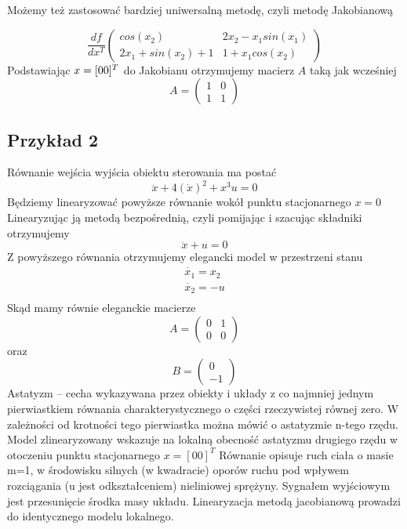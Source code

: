 \documentclass{article}
\begin{document}
			Możemy też zastosować bardziej uniwersalną metodę, czyli metodę Jakobianową

			\begin{equation}
				\frac{df}{dx^T}
				\begin{pmatrix}
					cos(x_2) & 2x_2 - x_1 sin(x_1) \\
					2x_1 + sin(x_2) + 1 & 1 + x_1 cos(x_2)
				\end{pmatrix}
			\end{equation}
			Podstawiając $x = [ 0 \space 0 ]^T$ do Jakobianu otrzymujemy macierz $A$ taką jak wcześniej
			\begin{equation}
				A = 
				\begin{pmatrix}
					1 & 0 \\
					1 & 1 
				\end{pmatrix}
			\end{equation}
		\subsection{Przykład 2}
			Równanie wejścia wyjścia obiektu sterowania ma postać
			\begin{equation}
				\ddot{x} + 4(\dot{x})^2 + x^3u = 0
			\end{equation}
			Będziemy linearyzować powyższe równanie wokół punktu stacjonarnego $x = 0$
			Linearyzując ją metodą bezpośrednią, czyli pomijając i szacując składniki
			otrzymujemy 
			\begin{equation}
				\ddot{x} + u = 0
			\end{equation}
			Z powyższego równania otrzymujemy elegancki model w przestrzeni stanu
			\begin{align*}
				\dot{x_1} = x_2 \\
				\dot{x_2} = -u \\
			\end{align*}
			Skąd mamy równie eleganckie macierze 
			\begin{equation}
				A = 
				\begin{pmatrix}
					0 & 1 \\
					0 & 0 
				\end{pmatrix}
			\end{equation}
			oraz
			\begin{equation}
				B = 
				\begin{pmatrix}
					0 \\
					-1 
				\end{pmatrix}
			\end{equation}
			Astatyzm – cecha wykazywana przez obiekty i układy z co najmniej jednym
			pierwiastkiem równania charakterystycznego o części rzeczywistej równej
			zero. W zależności od krotności tego pierwiastka można mówić o astatyzmie
			n-tego rzędu.
			\newline
			\newline
			Model zlinearyzowany wskazuje na lokalną obecność astatyzmu drugiego rzędu 
			w otoczeniu punktu stacjonarnego $x = [0 0]^T$
			Równanie opisuje ruch ciała o masie m=1, w środowisku silnych (w kwadracie) oporów
			ruchu pod wpływem rozciągania (u jest odkształceniem) nieliniowej sprężyny.
			Sygnałem wyjściowym jest przesunięcie środka masy układu. Linearyzacja metodą
			jacobianową prowadzi do identycznego modelu lokalnego.
\end{document}
